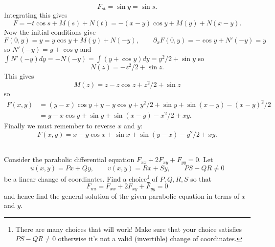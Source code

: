 \documentclass[12pt]{article}
\begin{document}
\begin{answer}
\begin{enumerate}[(a)]
\[F_{st}=\sin y=\sin s.\]
Integrating this gives
\[F=-t\cos s+M(s)+N(t)=-(x-y)\cos y+M(y)+N(x-y).\]
Now the initial conditions give
\[F(0,y)=y=y\cos y+M(y)+N(-y),\qquad \partial_xF(0,y)=-\cos y+N'(-y)=y\]
so $N'(-y)=y+\cos y$ and $\int N'(-y)dy=-N(-y)=\int (y+\cos y)dy=y^2/2+\sin y$ so
\[N(z)=-z^2/2+\sin z.\]
This gives
\[M(z)=z-z\cos z+z^2/2+\sin z\]
so
\begin{align*}
F(x,y)&=(y-x)\cos y+y-y\cos y+y^2/2+\sin y+\sin(x-y)-(x-y)^2/2\\
&=y-x\cos y+\sin y+\sin(x-y)-x^2/2+xy.
\end{align*}
Finally we must remember to reverse $x$ and $y$:
\[F(x,y)=x-y\cos x+\sin x+\sin(y-x)-y^2/2+xy.\]
\end{enumerate}
\end{answer}
\newpage

\bigskip

\begin{question}\ \\
Consider the parabolic differential equation $F_{xx}+2F_{xy}+F_{yy}=0$. Let
\[u(x,y)=Px+Qy,\qquad v(x,y)=Rx+Sy,\qquad PS-QR\neq 0\]
be a linear change of coordinates. Find a choice\footnote{There are many choices that will work! Make sure that your choice satisfies $PS-QR\neq 0$ otherwise it's not a valid (invertible) change of coordinates.} of $P,Q,R,S$ so that
\[F_{uu}=F_{xx}+2F_{xy}+F_{yy}=0\]
and hence find the general solution of the given parabolic equation in terms of $x$ and $y$.
\end{question}
\end{document}
